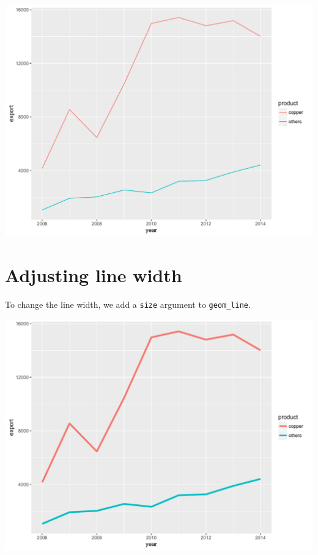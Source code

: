 \begin{Shaded}
\begin{Highlighting}[]
\StringTok{ }\NormalTok{() +}\StringTok{ }\NormalTok{(}\NormalTok{(}   
\StringTok{\StringTok{        }} \NormalTok{)}
\end{Highlighting}
\end{Shaded}

\begin{center}\includegraphics[width=0.55\linewidth]{figures/line_1-1} \end{center}

\section{Adjusting line width}\label{adjusting-line-width}

To change the line width, we add a \texttt{size} argument to
\texttt{geom\_line}.

\begin{Shaded}
\begin{Highlighting}[]
\StringTok{ }\NormalTok{() +}\StringTok{ }\NormalTok{(}\NormalTok{(}   
\StringTok{\StringTok{        }}\NormalTok{, } \NormalTok{)}
\end{Highlighting}
\end{Shaded}

\begin{center}\includegraphics[width=0.55\linewidth]{figures/line_2-1} \end{center}

